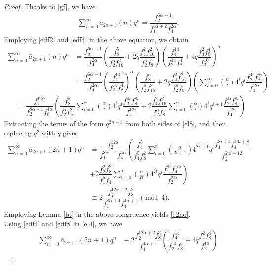 \documentclass[10pt,a4paper]{amsart}
\begin{document}
	\begin{proof}
	Thanks to \eqref{gf}, we have
	\begin{align*}
	\sum_{n=0}^{\infty}\bar{a}_{2\alpha+1}(n)q^n=\dfrac{f_2^{6\alpha+1}}{f_1^{4\alpha+2}f_4^{2\alpha}}.
	\end{align*}
	Employing \eqref{edf2} and \eqref{edf4} in the above equation, we obtain
	\begin{align}
		\sum_{n=0}^{\infty}\bar{a}_{2\alpha+1}(n)q^n&=\dfrac{f_2^{6\alpha+1}}{f_4^{2\alpha}}\left(\dfrac{f_8^5}{f_2^5f_{16}^2}+2q\dfrac{f_4^2f_{16}^2}{f_2^5f_8}\right)\left(\dfrac{f_4^{14}}{f_2^{14}f_8^4}+4q\dfrac{f_4^2f_8^4}{f_2^{10}}\right)^\alpha\nonumber\\
		&=\dfrac{f_2^{6\alpha+1}}{f_4^{2\alpha}}\left(\dfrac{f_4^{14}}{f_2^{14}f_8^4}\right)^\alpha\left(\dfrac{f_8^5}{f_2^5f_{16}^2}+2q\dfrac{f_4^2f_{16}^2}{f_2^5f_8}\right)\left(\sum_{i=0}^{\infty}\binom{\alpha}{i}4^iq^i\dfrac{f_2^{4i}f_8^{8i}}{f_4^{12i}}\right)\nonumber
	\end{align}
	\begin{align}
		&=\dfrac{f_4^{12\alpha}}{f_2^{8\alpha-1}f_8^{4\alpha}}\left(\dfrac{f_8^5}{f_2^5f_{16}^2}\sum_{i=0}^{\alpha}\binom{\alpha}{i}4^iq^i\dfrac{f_2^{4i}f_8^{8i}}{f_4^{12i}}+2\dfrac{f_4^2f_{16}^2}{f_2^5f_8}\sum_{i=0}^{\alpha}\binom{\alpha}{i}4^iq^{i+1}\dfrac{f_2^{4i}f_8^{8i}}{f_4^{12i}}\right)\label{el8}
	\end{align}
		Extracting the terms of the form $q^{2n+1}$ from both sides of \eqref{el8}, and then replacing $q^{2}$ with $q$ gives
	\begin{align}
	\sum_{n=0}^{\infty}\bar{a}_{2\alpha+1}(2n+1)q^n&=\dfrac{f_2^{12\alpha}}{f_1^{8\alpha-1}f_4^{4\alpha}}\left(\dfrac{f_4^5}{f_1^5f_{8}^2}\sum_{i=0}^{\alpha}\binom{\alpha}{2i+1}4^{2i+1}q^i\dfrac{f_1^{8i+4}f_4^{16i+8}}{f_2^{24i+12}}\right.\nonumber\\
	&\left.+2\dfrac{f_2^2f_{8}^2}{f_1^5f_4}\sum_{i=0}^{\alpha}\binom{\alpha}{2i}4^{2i}q^{i}\dfrac{f_1^{8i}f_4^{16i}}{f_2^{24i}}\right)\nonumber\\
	&\equiv 2\dfrac{f_2^{12\alpha+2}f_8^2}{f_1^{8\alpha+4}f_4^{4\alpha+1}}\pmod 4.\label{el4}
	\end{align}
	Employing Lemma \ref{bt} in the above congruence yields \eqref{e2no}.\\
\indent	Using \eqref{edf4} and \eqref{edf8} in \eqref{el4}, we have
\begin{align}
\sum_{n=0}^{\infty}\bar{a}_{2\alpha+1}(2n+1)q^n&\equiv 2\dfrac{f_2^{12\alpha+2}f_8^2}{f_4^{4\alpha+1}}\left(\dfrac{f_4^{14}}{f_2^{14}f_8^4}+4q\dfrac{f_4^2f_8^4}{f_2^{10}}\right)\nonumber\\

\end{align}
\end{proof}
\end{document}
